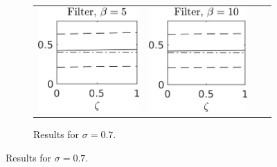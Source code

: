 \documentclass[10pt]{article}
\begin{document}
\begin{figure}[t]
\begin{subfigure}{\linewidth}
\begin{tabular}{cccc}
			\includegraphics[]{Figures/A2_filt_s7_b5.png} & \includegraphics[]{Figures/A2_filt_s7_b10.png}
		\end{tabular}	
		\caption{Results for $\sigma = 0.7$.}
	\end{subfigure}
	

\end{figure}
\end{document}
